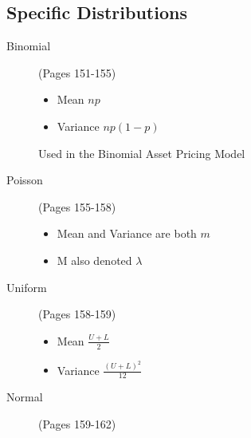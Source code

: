 
\subsection{Specific Distributions}

\begin{description}

\item[Binomial]
(Pages 151-155)
\begin{itemize}
\item Mean $\displaystyle{ np}$
\item Variance $\displaystyle{ np(1-p) }$
\end{itemize}
Used in the Binomial Asset Pricing Model
\item[Poisson]
(Pages 155-158)
\begin{itemize}
\item Mean and Variance are both $m$
\item M also denoted $\lambda$
\end{itemize}

\item[Uniform]
(Pages 158-159)

\begin{itemize}
\item Mean $\displaystyle{ \frac{U+L}{2} }$
\item Variance $\displaystyle{ \frac{(U+L)^2}{12} }$
\end{itemize}

\item[Normal]
(Pages 159-162)

\end{description}

